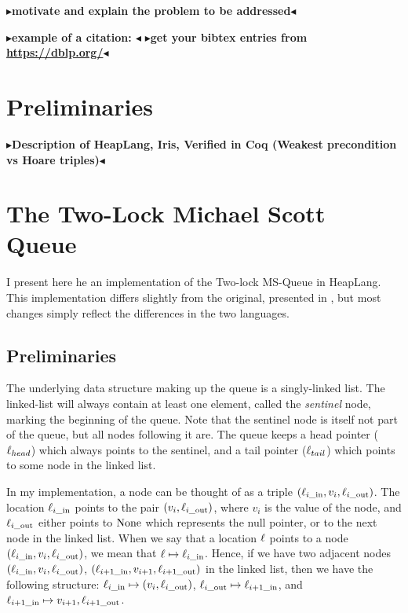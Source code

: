 \documentclass[twoside,11pt,openright]{report}
\newcommand{\locin}[1]{\loc_{#1\_\text{in}}}
\newcommand{\locout}[1]{\loc_{#1\_\text{out}}}
\newcommand{\todo}[1]{{\color[rgb]{.5,0,0}\textbf{$\blacktriangleright$#1$\blacktriangleleft$}}}
\begin{document}
\todo{motivate and explain the problem to be addressed}

\todo{example of a citation: \cite{DBLP:conf/podc/MichaelS96}}
\todo{get your bibtex entries from \url{https://dblp.org/}}


\chapter{Preliminaries}
\label{ch:preliminaries}
\todo{Description of HeapLang, Iris, Verified in Coq (Weakest precondition vs Hoare triples)}

\chapter{The Two-Lock Michael Scott Queue}

I present here he an implementation of the Two-lock MS-Queue in HeapLang. This implementation differs slightly from the original, presented in \cite{DBLP:conf/podc/MichaelS96}, but most changes simply reflect the differences in the two languages.


\section{Preliminaries}

The underlying data structure making up the queue is a singly-linked list. The linked-list will always contain at least one element, called the \emph{sentinel} node, marking the beginning of the queue. Note that the sentinel node is itself not part of the queue, but all nodes following it are. The queue keeps a head pointer ($\ell_{head}$) which always points to the sentinel, and a tail pointer ($\ell_{tail}$) which points to some node in the linked list.

In my implementation, a node can be thought of as a triple $(\locin{i}, v_i, \locout{i})$. The location $\locin{i}$ points to the pair $(v_i, \locout{i})$, where $v_i$ is the value of the node, and $\locout{i}$ either points to $\operatorname{None}$ which represents the null pointer, or to the next node in the linked list. When we say that a location $\ell$ points to a node $(\locin{i}, v_i, \locout{i})$, we mean that $\loc \mapsto \locin{i}$. Hence, if we have two adjacent nodes $(\locin{i}, v_i, \locout{i})$, $(\locin{i+1}, v_{i+1}, \locout{i+1})$ in the linked list, then we have the following structure: $\locin{i} \mapsto (v_i, \locout{i})$, $\locout{i} \mapsto \locin{i+1}$, and $\locin{i+1} \mapsto v_{i+1}, \locout{i+1}$.
\end{document}
